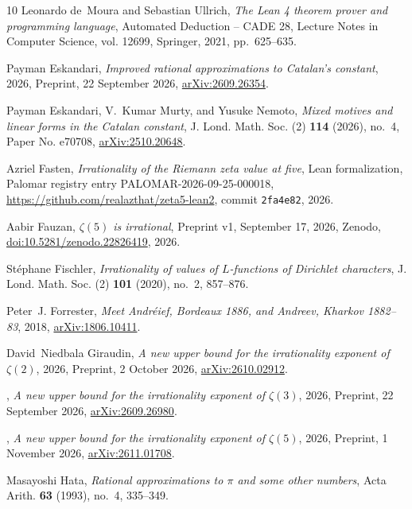 \documentclass[11pt]{amsart}
\theoremstyle{definition}
\theoremstyle{remark}
\numberwithin{equation}{section}
\begin{document}
\begin{thebibliography}{10}
Leonardo de~Moura and Sebastian Ullrich, \emph{The {L}ean 4 theorem prover and
  programming language}, Automated Deduction -- CADE 28, Lecture Notes in
  Computer Science, vol. 12699, Springer, 2021, pp.~625--635.

Payman Eskandari, \emph{Improved rational approximations to {C}atalan's
  constant}, 2026, Preprint, 22 September 2026,
  \href{https://arxiv.org/abs/2609.26354}{arXiv:2609.26354}.

Payman Eskandari, V.~Kumar Murty, and Yusuke Nemoto, \emph{Mixed motives and
  linear forms in the {C}atalan constant}, J. Lond. Math. Soc. (2) \textbf{114}
  (2026), no.~4, Paper No. e70708,
  \href{https://arxiv.org/abs/2510.20648}{arXiv:2510.20648}.

Azriel Fasten, \emph{Irrationality of the {R}iemann zeta value at five}, Lean
  formalization, Palomar registry entry PALOMAR-2026-09-25-000018,
  \url{https://github.com/realazthat/zeta5-lean2}, commit \texttt{2fa4e82},
  2026.

Aabir Fauzan, \emph{{$\zeta(5)$} is irrational}, Preprint v1, September 17,
  2026, Zenodo,
  \href{https://doi.org/10.5281/zenodo.22826419}{doi:10.5281/zenodo.22826419},
  2026.

St\'ephane Fischler, \emph{Irrationality of values of {$L$}-functions of
  {D}irichlet characters}, J. Lond. Math. Soc. (2) \textbf{101} (2020), no.~2,
  857--876.

Peter~J. Forrester, \emph{Meet {A}ndr\'eief, {B}ordeaux 1886, and {A}ndreev,
  {K}harkov 1882--83}, 2018,
  \href{https://arxiv.org/abs/1806.10411}{arXiv:1806.10411}.

David~Niedbala Giraudin, \emph{A new upper bound for the irrationality exponent
  of {$\zeta(2)$}}, 2026, Preprint, 2 October 2026,
  \href{https://arxiv.org/abs/2610.02912}{arXiv:2610.02912}.

\bysame, \emph{A new upper bound for the irrationality exponent of
  {$\zeta(3)$}}, 2026, Preprint, 22 September 2026,
  \href{https://arxiv.org/abs/2609.26980}{arXiv:2609.26980}.

\bysame, \emph{A new upper bound for the irrationality exponent of
  {$\zeta(5)$}}, 2026, Preprint, 1 November 2026,
  \href{https://arxiv.org/abs/2611.01708}{arXiv:2611.01708}.

Masayoshi Hata, \emph{Rational approximations to {$\pi$} and some other
  numbers}, Acta Arith. \textbf{63} (1993), no.~4, 335--349.


\end{thebibliography}
\end{document}
